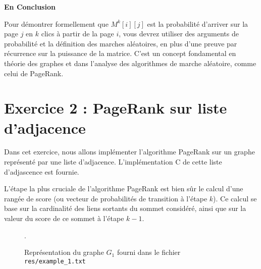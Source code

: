 \textbf{En Conclusion}

Pour démontrer formellement que $M^k[i][j]$ est la probabilité d'arriver sur la page $j$ en $k$ clics à partir de la page $i$, vous devrez utiliser des arguments de probabilité et la définition des marches aléatoires, en plus d'une preuve par récurrence sur la puissance de la matrice. C'est un concept fondamental en théorie des graphes et dans l'analyse des algorithmes de marche aléatoire, comme celui de PageRank.

\section{Exercice 2 : PageRank sur liste d'adjacence}
Dans cet exercice, nous allons implémenter l'algorithme PageRank sur un graphe représenté par une liste d'adjacence. L'implémentation C de cette liste d'adjascence est fournie.

L'étape la plus cruciale de l'algorithme PageRank est bien sûr le calcul d'une rangée de score (ou vecteur de probabilités de transition à l'étape $k$). Ce calcul se base sur la cardinalité des liens sortants du sommet considéré, ainsi que sur la valeur du score de ce sommet à l'étape $k-1$.

\begin{figure}
    \centering
    \caption{Représentation du graphe $G_1$ fourni dans le fichier \texttt{res/example\_1.txt}}.
    \label{fig:graph_g1}
\end{figure}

